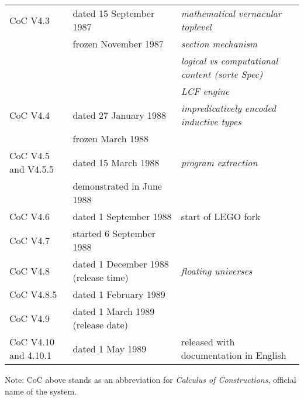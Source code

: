 \documentclass[a4paper]{book}
\newcommand{\feature}[1]{{\em #1}}
\begin{document}
\begin{tabular}{l|l|l}
CoC V4.3& dated 15 September 1987 & \feature{mathematical vernacular toplevel}\\
  & frozen November 1987 & \feature{section mechanism}\\
  & & \feature{logical vs computational content (sorte Spec)}\\
  & & \feature{LCF engine}\\

CoC V4.4& dated 27 January 1988 & \feature{impredicatively encoded inductive types}\\
  & frozen March 1988\\

CoC V4.5 and V4.5.5& dated 15 March 1988 & \feature{program extraction}\\
  & demonstrated in June 1988\\

CoC V4.6& dated 1 September 1988 & start of LEGO fork\\

CoC V4.7& started 6 September 1988 \\

CoC V4.8& dated 1 December 1988 (release time) & \feature{floating universes}\\

CoC V4.8.5& dated 1 February 1989 & \\

CoC V4.9& dated 1 March 1989 (release date)\\

CoC V4.10 and 4.10.1& dated 1 May 1989 & released with documentation in English\\
\end{tabular}

\bigskip

\noindent Note: CoC above stands as an abbreviation for {\em Calculus of
  Constructions}, official name of the system.
\bigskip
\bigskip

\newpage
\end{document}
